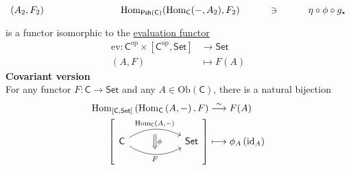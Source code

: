 {\[\begin{tikzcd}[ampersand replacement=\&]
            (A_2,F_2)  \& \& \& \operatorname{Hom}_{\mathsf{Psh}(\mathsf{C})}(\mathrm{Hom}_{\mathsf{C}}(-,A_2),F_2)\& \ni \& \eta\circ \phi\circ g_\star
        \end{tikzcd}
    \]
    is a functor isomorphic to the \hyperref[th:evaluation_functor]{evaluation functor}
    \begin{align*}
        \mathrm{ev}:\mathsf{C}^{\mathrm{op}}\times \left[\mathsf{C}^{\mathrm{op}},\mathsf{Set}\right]&\longrightarrow \mathsf{Set}\\
        \left(A,F\right)&\longmapsto F(A)
    \end{align*}
    \textbf{Covariant version}\\
    For any functor $F:\mathsf{C}\to \mathsf{Set}$ and any $A\in \mathrm{Ob}(\mathsf{C})$, there is a natural bijection
    \begin{align*}
        \operatorname{Hom}_{\left[\mathsf{C},\mathsf{Set}\right]}\left(\operatorname{Hom}_{\mathsf{C}}\left(A,-\right), F\right) & \overset{\sim}{\longrightarrow} F(A) \\
        {  \left[ \begin{tikzcd}[ampersand replacement=\&]
            \mathsf{C} \arrow[r, "\operatorname{Hom}_{\mathsf{C}}\left(A{,}-\right)"{name=A, above}, bend left] \arrow[r, "F"'{name=B, below}, bend right] \&[+30pt] \mathsf{Set}
            \arrow[Rightarrow, shorten <=5.5pt, shorten >=5.5pt, from=A.south-|B, to=B, "\phi"]
        \end{tikzcd}\right] } & \longmapsto \phi_A\left(\operatorname{id}_A\right)
    \end{align*}
}
